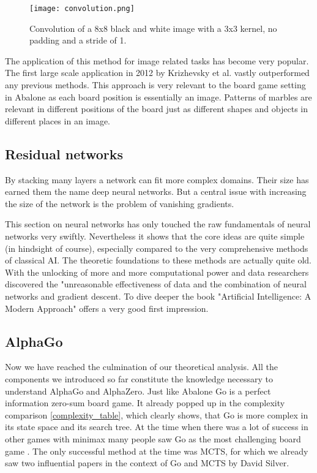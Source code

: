 \begin{figure}
    \centering
    \texttt{[image: convolution.png]}
    \caption{Convolution of a 8x8 black and white image with a 3x3 kernel, no padding and a stride of 1. \cite{bruasdal_deep_2020}}
    \label{convolution}
\end{figure}


The application of this method for image related tasks has become very popular. The first large scale application in 2012 by Krizhevsky et al. \cite{krizhevsky_imagenet_2017} vastly outperformed any previous methods. This approach is very relevant to the board game setting in Abalone as each board position is essentially an image. Patterns of marbles are relevant in different positions of the board just as different shapes and objects in different places in an image.

\subsection{Residual networks}
By stacking many layers a network can fit more complex domains. Their size has earned them the name deep neural networks. But a central issue with increasing the size of the network is the problem of vanishing gradients.

This section on neural networks has only touched the raw fundamentals of neural networks very swiftly. Nevertheless it shows that the core ideas are quite simple (in hindsight of course), especially compared to the very comprehensive methods of classical AI. The theoretic foundations to these methods are actually quite old. With the unlocking of more and more computational power and data researchers discovered the "unreasonable effectiveness of data \cite{halevy_unreasonable_2009} and the combination of neural networks and gradient descent. To dive deeper the book "Artificial Intelligence: A Modern Approach" \cite{russell_artificial_2021} offers a very good first impression.

\subsection{AlphaGo}
Now we have reached the culmination of our theoretical analysis. All the components we introduced so far constitute the knowledge necessary to understand AlphaGo and AlphaZero. Just like Abalone Go is a perfect information zero-sum board game. It already popped up in the complexity comparison \ref{complexity_table}, which clearly shows, that Go is more complex in its state space and its search tree. At the time when there was a lot of success in other games with minimax many people saw Go as the most challenging board game \cite{muller_computer_2002}. The only successful method at the time was MCTS, for which we already saw two influential papers in the context of Go and MCTS by David Silver.

